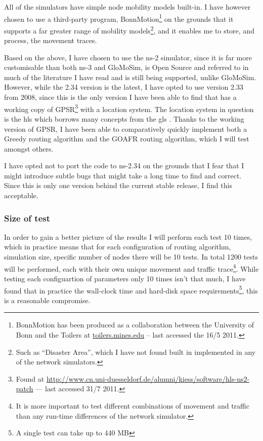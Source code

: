 All of the simulators have simple node mobility models built-in. I have however chosen to use a third-party program, BonnMotion\footnote{BonnMotion has been produced as a collaboration between the University of Bonn and the Toilers at \url{toilers.mines.edu} -- last accessed the 16/5 2011.} on the grounds that it supports a far greater range of mobility models\footnote{Such as ``Disaster Area'', which I have not found built in implemented in any of the network simulators.}, and it enables me to store, and process, the movement traces.

Based on the above, I have chosen to use the ns-2 simulator, since it is far more customisable than both ns-3 and GloMoSim, is Open Source and referred to in much of the literature I have read \cite{directed, gpsr, energyConservation, two-tier} and is still being supported, unlike GloMoSim. However, while the 2.34 version is the latest, I have opted to use version 2.33 from 2008, since this is the only version I have been able to find that has a working copy of GPSR\footnote{Found at \url{http://www.cn.uni-duesseldorf.de/alumni/kiess/software/hls-ns2-patch} --- last accessed 31/7 2011.} with a location system. The location system in question is the \ac{hls} which borrows many concepts from the \ac{gls} \cite{hls}. Thanks to the working version of GPSR, I have been able to comparatively quickly implement both a Greedy routing algorithm and the GOAFR routing algorithm, which I will test amongst others. 

I have opted not to port the code to ns-2.34 on the grounds that I fear that I might introduce subtle bugs that might take a long time to find and correct. Since this is only one version behind the current stable release, I find this acceptable.

\subsubsection{Size of test}
In order to gain a better picture of the results I will perform each test 10 times, which in practice means that for each configuration of routing algorithm, simulation size, specific number of nodes there will be 10 tests. In total 1200 tests will be performed, each with their own unique movement and traffic trace\footnote{It is more important to test different combinations of movement and traffic than any run-time differences of the network simulator.}. While testing each configuartion of parameters only 10 times isn't that much, I have found that in practice the wall-clock time and hard-disk space requirements\footnote{A single test can take up to 440 MB}, this is a reasonable compromise.

